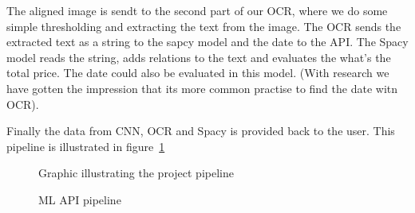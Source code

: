 The aligned image is sendt to the second part of our OCR, where we do some simple thresholding and extracting the text from the image.
The OCR sends the extracted text as a string to the sapcy model and the date to the API\@.
The Spacy model reads the string, adds relations to the text and evaluates the what's the total price.
The date could also be evaluated in this model. (With research we have gotten the impression that its more common practise to find the date witn OCR).


Finally the data from CNN, OCR and Spacy is provided back to the user.
This pipeline is illustrated in figure~\ref{fig:pipeline}

\begin{figure}[h]
    \caption{Graphic illustrating the project pipeline}
    \label{fig:pipeline}
\end{figure}

\begin{figure}[h]
    \caption{ML API pipeline}
    \label{fig:ML API}
\end{figure}

